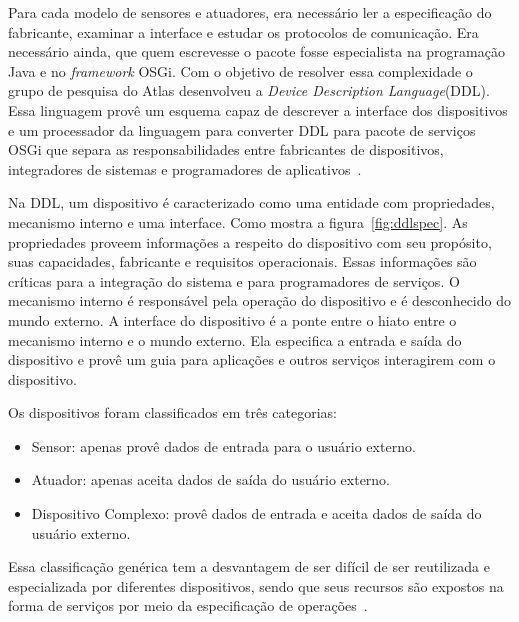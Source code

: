 Para cada modelo de sensores e atuadores, era necessário ler a especificação do fabricante, examinar a interface e estudar os protocolos de comunicação. Era necessário ainda, que quem escrevesse o pacote fosse especialista na programação Java e no \emph{framework} OSGi. Com o objetivo de resolver essa complexidade o grupo de pesquisa do Atlas desenvolveu a \emph{Device Description Language}(DDL). Essa linguagem provê um esquema capaz de descrever a interface dos dispositivos e um processador da linguagem para converter DDL para pacote de serviços OSGi que separa as responsabilidades entre fabricantes de dispositivos, integradores de sistemas e programadores de aplicativos~\cite{gatorTechDDL}.

Na DDL, um dispositivo é caracterizado como uma entidade com propriedades, mecanismo interno e uma interface. Como mostra a figura~\ref{fig:ddlspec}. As propriedades proveem informações a respeito do dispositivo com seu propósito, suas capacidades, fabricante e requisitos operacionais. Essas informações são críticas para a integração do sistema e para programadores de serviços. O mecanismo interno é responsável pela operação do dispositivo e é desconhecido do mundo externo. A interface do dispositivo é a ponte entre o hiato entre o mecanismo interno e o mundo externo. Ela especifica a entrada e saída do dispositivo e provê um guia para aplicações e outros serviços interagirem com o dispositivo.

Os dispositivos foram classificados em três categorias:
\begin{itemize}
	\item Sensor: apenas provê dados de entrada para o usuário externo.
	\item Atuador: apenas aceita dados de saída do usuário externo.
	\item Dispositivo Complexo: provê dados de entrada e aceita dados de saída do usuário externo.
\end{itemize}

Essa classificação genérica tem a desvantagem de ser difícil de ser reutilizada e especializada por diferentes dispositivos, sendo que seus recursos são expostos na forma de serviços por meio da especificação de operações~\cite{ddlSpec}.
